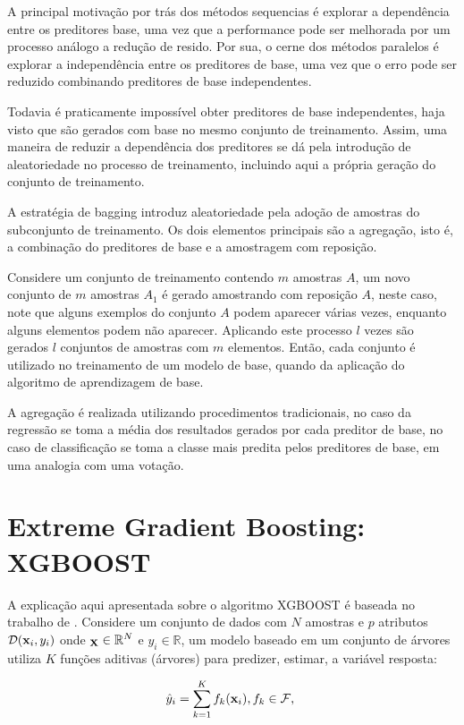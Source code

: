 A principal motivação por trás dos métodos sequencias é explorar a dependência entre os preditores base, uma vez que a performance pode ser melhorada por um processo análogo a redução de resido. Por sua, o cerne dos métodos paralelos é explorar a independência entre os preditores de base, uma vez que o erro pode ser reduzido combinando preditores de base independentes.

Todavia é praticamente impossível obter preditores de base independentes, haja visto que são gerados com base no mesmo conjunto de treinamento. Assim, uma maneira de reduzir a dependência dos preditores se dá pela introdução de aleatoriedade no processo de treinamento, incluindo aqui a própria geração do conjunto de treinamento.

A estratégia de bagging introduz aleatoriedade pela adoção de amostras do subconjunto de treinamento. Os dois elementos principais são a agregação, isto é, a combinação do preditores de base e a amostragem com reposição.

Considere um conjunto de treinamento contendo $m$ amostras $A$, um novo conjunto de $m$ amostras $A_1$ é gerado amostrando com reposição $A$, neste caso, note que alguns exemplos do conjunto $A$ podem aparecer várias vezes, enquanto alguns elementos podem não aparecer. Aplicando este processo $l$ vezes são gerados $l$ conjuntos de amostras com $m$ elementos. Então, cada conjunto é utilizado no treinamento de um modelo de base, quando da aplicação do algoritmo de aprendizagem de base.

A agregação é realizada utilizando procedimentos tradicionais, no caso da regressão se toma a média dos resultados gerados por cada preditor de base, no caso de classificação se toma a classe mais predita pelos preditores de base, em uma analogia com uma votação.

\section{Extreme Gradient Boosting: XGBOOST}

A explicação aqui apresentada sobre o algoritmo XGBOOST é baseada no trabalho de \cite{CHEN:2016}. Considere um conjunto de dados com $N$ amostras e $p$ atributos $\mathcal{D}({\bf x}_i, y_i)$ onde $_{\bf X}\in\mathbb{R}^N$ e $y_i\in\mathbb{R}$, um modelo baseado em um conjunto de árvores utiliza $K$ funções aditivas (árvores) para predizer, estimar, a variável resposta:

\begin{equation}\label{eq:xgboost}
\hat{y}_i=\sum_{k=1}^{K}f_{k}({\bf x}_i)\mbox{,}\,f_{k}\in\mathcal{F}\mbox{,}~
\end{equation}

